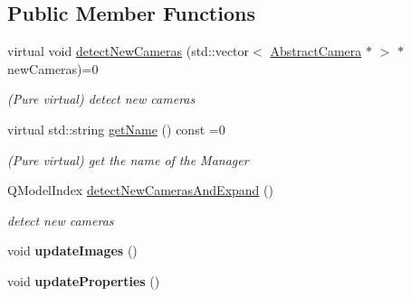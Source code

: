 \subsection*{Public Member Functions}
\begin{DoxyCompactItemize}
\item 
virtual void \hyperlink{class_abstract_camera_manager_a8e215b2531fd8c18551382dc8f571817}{detect\-New\-Cameras} (std\-::vector$<$ \hyperlink{class_abstract_camera}{Abstract\-Camera} $\ast$ $>$ $\ast$new\-Cameras)=0
\begin{DoxyCompactList}\small\item\em (Pure virtual) detect new cameras \end{DoxyCompactList}\item 
virtual std\-::string \hyperlink{class_abstract_camera_manager_a6e4b041842471b9ed42ddd5c9ab260d1}{get\-Name} () const =0
\begin{DoxyCompactList}\small\item\em (Pure virtual) get the name of the Manager \end{DoxyCompactList}\item 
Q\-Model\-Index \hyperlink{class_abstract_camera_manager_a609f8e3af887c5652ccf9a37d4e133c1}{detect\-New\-Cameras\-And\-Expand} ()
\begin{DoxyCompactList}\small\item\em detect new cameras \end{DoxyCompactList}\item 
\hypertarget{class_abstract_camera_manager_a336e5cf760314194c1baf1234b87b247}{void {\bfseries update\-Images} ()}\label{class_abstract_camera_manager_a336e5cf760314194c1baf1234b87b247}

\item 
\hypertarget{class_abstract_camera_manager_a518b8dd27c032030ff23930488da0a52}{void {\bfseries update\-Properties} ()}\label{class_abstract_camera_manager_a518b8dd27c032030ff23930488da0a52}


\end{DoxyCompactItemize}
